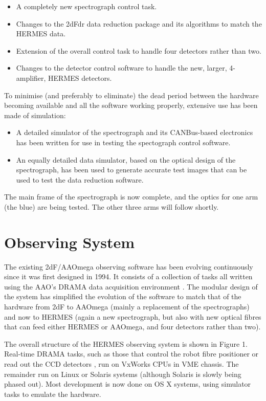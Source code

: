 \begin{itemize}
\itemsep0em
\item A completely new spectrograph control task.
\item Changes to the 2dFdr data reduction package and its algorithms to match the HERMES data.
\item Extension of the overall control task to handle four detectors rather than two.
\item Changes to the detector control software to handle the new, larger, 4-amplifier, HERMES detectors.
\end{itemize}

To minimise (and preferably to eliminate) the dead period between the hardware becoming available and all the software working properly, extensive use has been made of simulation:

\begin{itemize}
\itemsep0em
\item A detailed simulator of the spectrograph and its CANBus-based electronics has been written for use in testing the spectograph control software.
\item An equally detailed data simulator, based on the optical design of the spectrograph, has been used to generate accurate test images that can be used to  test the data reduction software.
\end{itemize}

The main frame of the spectrograph is now complete, and the optics for one arm (the blue) are being tested. The other three arms will follow shortly.

\section{Observing System}

The existing 2dF/AAOmega observing software has been evolving continuously since it was first designed in 1994. It consists of a collection of tasks all written using the AAO's DRAMA data acquisition environment \citep{Drama_1995}. The modular design of the system has simplified the evolution of the software to match that of the hardware from 2dF to AAOmega (mainly a replacement of the spectrographs) and now to HERMES (again a new spectrograph, but also with new optical fibres that can feed either HERMES or AAOmega, and four detectors rather than two).

The overall structure of the HERMES observing system is shown in Figure 1. Real-time DRAMA tasks, such as those that control the robot fibre positioner or read out the CCD detectors \citep{AAO2_2004},  run on VxWorks CPUs in VME chassis. The remainder run on Linux or Solaris systems (although Solaris is slowly being phased out). Most development is now done on OS X systems, using simulator tasks to emulate the hardware.

